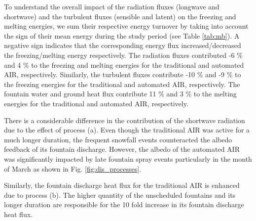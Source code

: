 \documentclass[tc, manuscript]{copernicus}
\begin{document}
To understand the overall impact of the radiation fluxes (longwave and shortwave) and the turbulent fluxes
(sensible and latent) on the freezing and melting energies, we sum their respective energy turnover by taking
into account the sign of their mean energy during the study period (see Table \ref{tab:mb}). A negative sign
indicates that the corresponding energy flux increased/decreased the freezing/melting energy respectively.  The
radiation fluxes contributed -6 \% and 4 \% to the freezing and melting energies for the traditional and
automated AIR, respectively.  Similarly, the turbulent fluxes contribute -10 \% and -9 \% to the freezing
energies for the traditional and automated AIR, respectively. The fountain water and ground heat flux contribute
11 \% and 3 \% to the melting energies for the traditional and automated AIR, respectively. 

There is a considerable difference in the contribution of the shortwave radiation due to the effect of process
(a). Even though the traditional AIR was active for a much longer duration, the frequent snowfall events
counteracted the albedo feedback of its fountain discharge. However, the albedo of the automated AIR was
significantly impacted by late fountain spray events particularly in the month of March as shown in Fig.
\ref{fig:dis_processes}.

Similarly, the fountain discharge heat flux for the traditional AIR is enhanced due to process (b). The higher
quantity of the unscheduled fountains and its longer duration are responsible for the 10 fold increase in its
fountain discharge heat flux.
\end{document}
